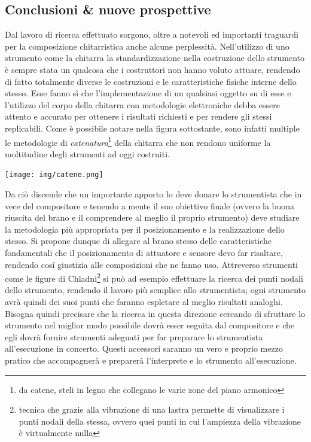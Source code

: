 \documentclass[oneside]{article}
\begin{document}
\begin{multicols*}{2}

\section{ Conclusioni \& nuove prospettive}
\noindent

Dal lavoro di ricerca effettuato sorgono, oltre a notevoli ed importanti traguardi per la composizione chitarristica anche alcune perplessità. 
Nell’utilizzo di uno strumento come la chitarra la standardizzazione nella costruzione dello strumento è sempre stata un qualcosa che i costruttori non hanno voluto attuare, rendendo di fatto totalmente diverse le costruzioni e le caratteristiche fisiche interne dello stesso. Esse fanno sì che l'implementazione di un qualsiasi oggetto su di esse e l'utilizzo del corpo della chitarra con metodologie elettroniche debba essere attento e accurato per ottenere i risultati richiesti e per rendere gli stessi replicabili. Come è possibile notare nella figura sottostante, sono infatti multiple le metodologie di \textit{catenatura}\footnote{da catene, steli in legno che collegano le varie zone del piano armonico} della chitarra che non rendono uniforme la moltitudine degli strumenti ad oggi costruiti.

\texttt{[image: img/catene.png]}

\noindent
Da ciò discende che un importante apporto lo deve donare lo strumentista che in vece del compositore e tenendo a mente il suo obiettivo finale (ovvero la buona riuscita del brano e il comprendere al meglio il proprio strumento) deve studiare la metodologia più appropriata per il posizionamento e la realizzazione dello stesso. Si propone dunque di allegare al brano stesso delle caratteristiche fondamentali che il posizionamento di attuatore e sensore devo far risaltare, rendendo cosí giustizia alle composizioni che ne fanno uso. Attreverso strumenti come le figure di Chladni\footnote{tecnica che grazie alla vibrazione di una lastra permette di visualizzare i punti nodali della stessa, ovvero quei punti in cui l'ampiezza della vibrazione è virtualmente nulla} si può ad esempio effettuare la ricerca dei punti nodali dello strumento, rendendo il lavoro più semplice allo strumentista; ogni strumento avrà quindi dei suoi punti che faranno espletare al meglio risultati analoghi. Bisogna quindi precisare che la ricerca in questa direzione cercando di sfruttare lo strumento nel miglior modo possibile dovrà esser seguita dal compositore e che egli dovrà fornire strumenti adeguati per far preparare lo strumentista all'esecuzione in concerto. Questi accessori saranno un vero e proprio mezzo pratico che accompagnerà e preparerà l'interprete e lo strumento all'esecuzione.



\end{multicols*}
\end{document}
